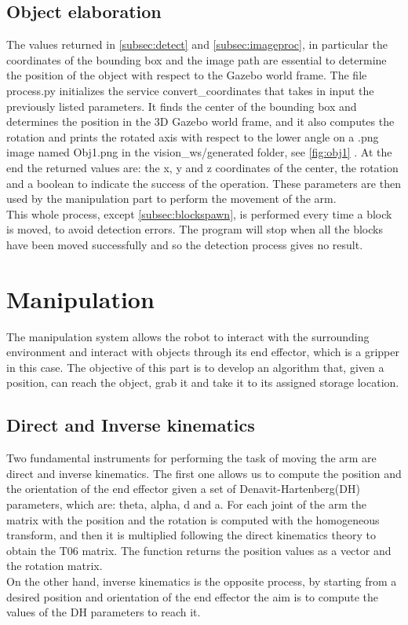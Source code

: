 \documentclass[12pt,a4paper]{article}
\begin{document}
\subsection{Object elaboration}\label{subsec:objel}
The values returned in \ref{subsec:detect} and \ref{subsec:imageproc}, in particular the coordinates of the bounding box and the image path are essential to determine the position of the object with respect to the Gazebo world frame. The file process.py initializes the service convert\_coordinates that takes in input the previously listed parameters. It finds the center of the bounding box and determines the position in the 3D Gazebo world frame, and it also computes the rotation and prints the rotated  axis with respect to the lower angle on a .png image named Obj1.png in the vision\_ws/generated folder, see \ref{fig:obj1} . At the end the returned values are: the x, y and z coordinates of the center, the rotation and a boolean to indicate the success of the operation. These parameters are then used by the manipulation part to perform the movement of the arm.\\
This whole process, except \ref{subsec:blockspawn}, is performed every time a block is moved, to avoid detection errors. The program will stop when all the blocks have been moved successfully and so the detection process gives no result.

\section{Manipulation}\label{sec:manipulation}
The manipulation system allows the robot to interact with the surrounding environment and interact with objects through its end effector, which is a gripper in this case.
The objective of this part is to develop an algorithm that, given a position, can reach the object, grab it and take it to its assigned storage location.
\subsection{Direct and Inverse kinematics}\label{subsec:kinematics}
Two fundamental instruments for performing the task of moving the arm are direct and inverse kinematics. The first one allows us to compute the position and the orientation of the end effector given a set of Denavit-Hartenberg(DH) parameters, which are: theta, alpha, d and a. For each joint of the arm the matrix with the position and the rotation is computed with the homogeneous transform, and then it is multiplied following the direct kinematics theory to obtain the T06 matrix. The function returns the position values as a vector and the rotation matrix.\\
On the other hand, inverse kinematics is the opposite process, by starting from a desired position and orientation of the end effector the aim is to compute the values of the DH parameters to reach it.
\end{document}
